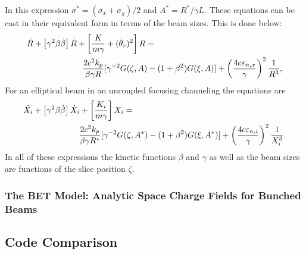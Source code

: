 %
In this expression $\sigma^* = (\sigma_x+\sigma_y)/2 $ and $A^* = R^*/\gamma L$.
These equations can be cast in their equivalent form in terms of the beam sizes.
This is done below:
%
\begin{eqnarray}
\lefteqn{\ddot R+ \left[\gamma^2\beta\dot\beta\right]\dot R + \left[\frac{K}{m\gamma}+(\dot\theta_r)^2\right]R=} &&
\nonumber
\\
& & \hspace{2cm} \frac{2c^2k_p}{\beta \gamma R}[ \gamma^{-2}G(\zeta,A) - (1+\beta^2)G(\xi,A) ]+\left(\frac{4c\epsilon_{n,x}}{\gamma}\right)^2\frac{1}{R^3},
\end{eqnarray}
%
For an elliptical beam in an uncoupled focusing channeling the equations are
%
\begin{eqnarray}
\lefteqn{\ddot X_i + \left[\gamma^2\beta\dot\beta\right]\dot X_i
+ \left[\frac{K_i}{m\gamma}\right]X_i=} &&
\nonumber
\\
& & \hspace{2cm}\frac{2c^2k_p}{\beta\gamma R^*}[ \gamma^{-2}G(\zeta,A^*) - (1+\beta^2)G(\xi,A^*) ]+\left(\frac{4c\epsilon_{n,i}}{\gamma}\right)^2\frac{1}{X_i^3}.
\end{eqnarray}
%
In all of these expressions the kinetic functions $\beta$ and $\gamma$ as well
as the beam sizes are functions of the slice position $\zeta$.

\subsubsection{The BET Model: Analytic Space Charge Fields for Bunched Beams}


\subsection{Code Comparison}

